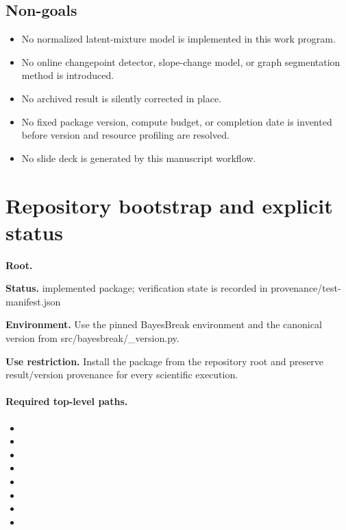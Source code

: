 \subsection{Non-goals}
\begin{itemize}[leftmargin=1.7em,itemsep=1.5pt,topsep=2pt]
\item No normalized latent-mixture model is implemented in this work program.
\item No online changepoint detector, slope-change model, or graph segmentation method is introduced.
\item No archived result is silently corrected in place.
\item No fixed package version, compute budget, or completion date is invented before version and resource profiling are resolved.
\item No slide deck is generated by this manuscript workflow.
\end{itemize}

\section{Repository bootstrap and explicit status}
\begin{statusbox}
\textbf{Root.} \par
\textbf{Status.} implemented package; verification state is recorded in provenance/test-manifest.json\par
\textbf{Environment.} Use the pinned BayesBreak environment and the canonical version from src/bayesbreak/\_version.py.\par
\textbf{Use restriction.} Install the package from the repository root and preserve result/version provenance for every scientific execution.
\end{statusbox}
\paragraph{Required top-level paths.}
\begin{itemize}[leftmargin=1.7em,itemsep=1.5pt,topsep=2pt]
\item {}
\item {}
\item {}
\item {}
\item {}
\item {}
\item {}
\item {}
\end{itemize}

